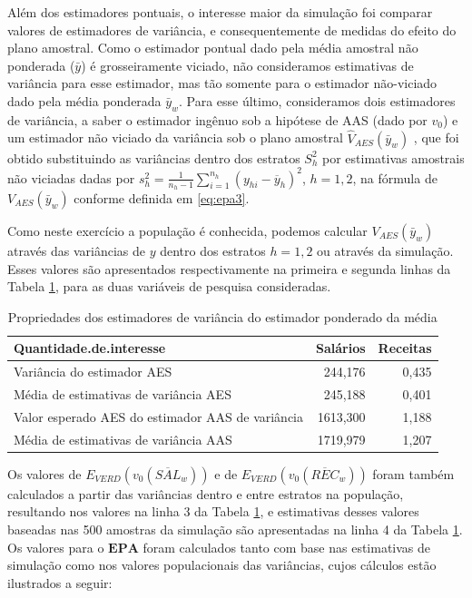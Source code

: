 \documentclass[]{book}
\theoremstyle{definition}
\theoremstyle{definition}
\theoremstyle{definition}
\theoremstyle{remark}
\begin{document}
Além dos estimadores pontuais, o interesse maior da simulação foi
comparar valores de estimadores de variância, e consequentemente de
medidas do efeito do plano amostral. Como o estimador pontual dado pela
média amostral não ponderada (\(\bar{y}\)) é grosseiramente viciado, não
consideramos estimativas de variância para esse estimador, mas tão
somente para o estimador não-viciado dado pela média ponderada
\(\bar{y}_{w}\). Para esse último, consideramos dois estimadores de
variância, a saber o estimador ingênuo sob a hipótese de AAS (dado por
\(v_{0}\)) e um estimador não viciado da variância sob o plano amostral
\(\hat{V}_{AES}\left( \bar{y}_{w}\right)\) , que foi obtido substituindo
as variâncias dentro dos estratos \(S_{h}^{2}\) por estimativas
amostrais não viciadas dadas por
\(s_{h}^{2}=\frac{1}{n_{h}-1}\sum_{i=1}^{n_{h}}(y_{hi}-\overline{y}_{h})^{2}\),
\(h=1,2\), na fórmula de \(V_{AES}\left( \bar{y}_{w}\right)\) conforme
definida em \eqref{eq:epa3}.

Como neste exercício a população é conhecida, podemos calcular
\(V_{AES}\left(\bar{y}_{w}\right)\) através das variâncias de \(y\)
dentro dos estratos \(h=1,2\) ou através da simulação. Esses valores são
apresentados respectivamente na primeira e segunda linhas da Tabela
\ref{tab:varest}, para as duas variáveis de pesquisa consideradas.

\begin{table}

\caption{\label{tab:varest}Propriedades dos estimadores de variância do estimador ponderado da média}
\centering
\begin{tabular}[t]{lrr}
\toprule
Quantidade.de.interesse & Salários & Receitas\\
\midrule
Variância do estimador AES & 244,176 & 0,435\\
Média de estimativas de variância AES & 245,188 & 0,401\\
Valor esperado AES do estimador AAS de variância & 1613,300 & 1,188\\
Média de estimativas de variância AAS & 1719,979 & 1,207\\
\bottomrule
\end{tabular}
\end{table}

Os valores de
\(E_{VERD}\left( v_{0}\left( \overline{SAL}_{w}\right) \right)\) e de
\(E_{VERD}\left( v_{0}\left( \overline{REC}_{w}\right) \right)\) foram
também calculados a partir das variâncias dentro e entre estratos na
população, resultando nos valores na linha 3 da Tabela \ref{tab:varest},
e estimativas desses valores baseadas nas 500 amostras da simulação são
apresentadas na linha 4 da Tabela \ref{tab:varest}. Os valores para o
\(\mathbf{EPA}\) foram calculados tanto com base nas estimativas de
simulação como nos valores populacionais das variâncias, cujos cálculos
estão ilustrados a seguir:
\end{document}
